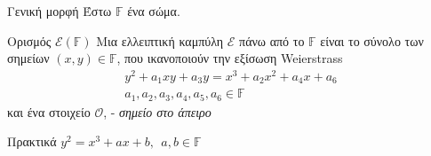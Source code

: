 \documentclass[handout]{beamer}
\begin{document}
\begin{frame}{Γενική μορφή}
Έστω $\mathbb F$ ένα σώμα.
\pause
\begin{block}{Ορισμός $\mathcal{E}(\mathbb{F})$}
Mια ελλειπτική καμπύλη $\mathcal{E}$ πάνω από το $\mathbb F$ είναι το σύνολο των σημείων  $(x,y) \in \mathbb F$, που ικανοποιούν την εξίσωση Weierstrass 
\begin{align*}
y^2+a_1xy+a_3y=x^3+a_2x^2+a_4x+a_6 \\  a_1, a_2, a_3, a_4, a_5, a_6 \in \mathbb{F}
\end{align*}  
 και  ένα στοιχείο $\mathcal O$, - \emph{σημείο στο άπειρο}
\end{block}
\pause
\begin{block}{Πρακτικά} 
$
y^2=x^3+ax+b ,\ \ a, b \in \mathbb F\  
$

\end{block}
\end{frame}
\end{document}
